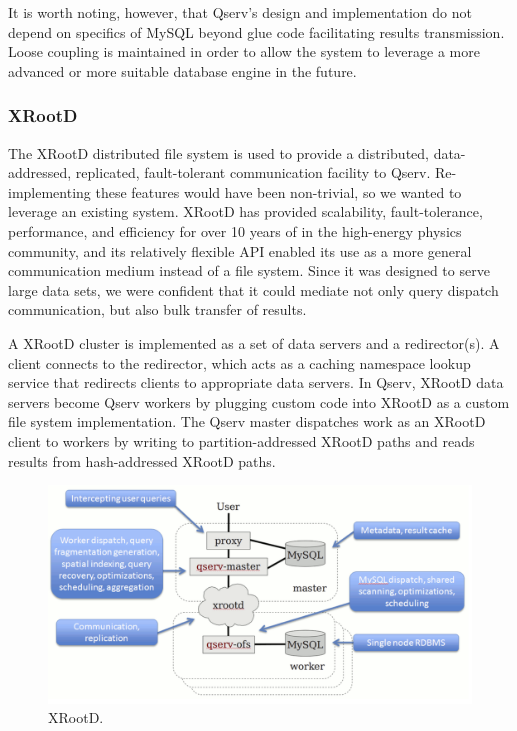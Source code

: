 \documentclass[DM,lsstdraft,toc]{lsstdoc}
\begin{document}
It is worth noting, however, that Qserv's design and implementation do
not depend on specifics of MySQL beyond glue code facilitating results
transmission. Loose coupling is maintained in order to allow the system
to leverage a more advanced or more suitable database engine in the
future.

\subsubsection{XRootD}\label{xrootd}

The XRootD distributed file system is used to
provide a distributed, data-addressed, replicated, fault-tolerant
communication facility to Qserv. Re-implementing these features would
have been non-trivial, so we wanted to leverage an existing system.
XRootD has provided scalability,
fault-tolerance, performance, and efficiency for over 10 years of in the
high-energy physics community, and its relatively flexible API enabled
its use as a more general communication medium instead of a file system.
Since it was designed to serve large data sets, we were confident that
it could mediate not only query dispatch communication, but also bulk
transfer of results.

A XRootD cluster is implemented as a set of
data servers and a redirector(s). A client connects to the redirector,
which acts as a caching namespace lookup service that redirects clients
to appropriate data servers. In Qserv, XRootD
data servers become Qserv workers by plugging custom code into
XRootD as a custom file system implementation.
The Qserv master dispatches work as an XRootD
client to workers by writing to partition-addressed
XRootD paths and reads results from
hash-addressed XRootD paths.

\begin{figure}[H]
\centering
\includegraphics{_static/xrootd.png}
\caption{XRootD.}
\end{figure}
\end{document}
